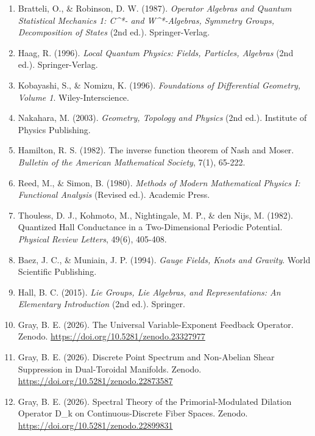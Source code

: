 \documentclass[12pt, a4paper]{article}
\begin{document}
\begin{enumerate}
\item[{[1]}] Bratteli, O., & Robinson, D. W. (1987). \textit{Operator Algebras and Quantum Statistical Mechanics 1: C^{*}- and W^{*}-Algebras, Symmetry Groups, Decomposition of States} (2nd ed.). Springer-Verlag.
\item[{[2]}] Haag, R. (1996). \textit{Local Quantum Physics: Fields, Particles, Algebras} (2nd ed.). Springer-Verlag.
\item[{[3]}] Kobayashi, S., & Nomizu, K. (1996). \textit{Foundations of Differential Geometry, Volume 1}. Wiley-Interscience.
\item[{[4]}] Nakahara, M. (2003). \textit{Geometry, Topology and Physics} (2nd ed.). Institute of Physics Publishing.
\item[{[5]}] Hamilton, R. S. (1982). The inverse function theorem of Nash and Moser. \textit{Bulletin of the American Mathematical Society}, 7(1), 65-222.
\item[{[6]}] Reed, M., & Simon, B. (1980). \textit{Methods of Modern Mathematical Physics I: Functional Analysis} (Revised ed.). Academic Press.
\item[{[7]}] Thouless, D. J., Kohmoto, M., Nightingale, M. P., & den Nijs, M. (1982). Quantized Hall Conductance in a Two-Dimensional Periodic Potential. \textit{Physical Review Letters}, 49(6), 405-408.
\item[{[8]}] Baez, J. C., & Muniain, J. P. (1994). \textit{Gauge Fields, Knots and Gravity}. World Scientific Publishing.
\item[{[9]}] Hall, B. C. (2015). \textit{Lie Groups, Lie Algebras, and Representations: An Elementary Introduction} (2nd ed.). Springer.
\item[{[10]}] Gray, B. E. (2026). The Universal Variable-Exponent Feedback Operator. Zenodo. \url{https://doi.org/10.5281/zenodo.23327977}
\item[{[11]}] Gray, B. E. (2026). Discrete Point Spectrum and Non-Abelian Shear Suppression in Dual-Toroidal Manifolds. Zenodo. \url{https://doi.org/10.5281/zenodo.22873587}
\item[{[12]}] Gray, B. E. (2026). Spectral Theory of the Primorial-Modulated Dilation Operator D_{k} on Continuous-Discrete Fiber Spaces. Zenodo. \url{https://doi.org/10.5281/zenodo.22899831}
\end{enumerate}
​
\end{document}
